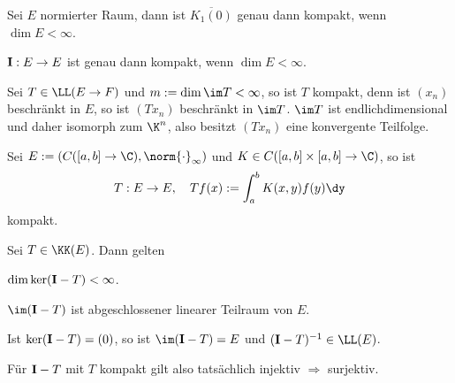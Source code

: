 \begin{cor}
\label{prop:6.10}
Sei $E$ normierter Raum, dann ist $\overline{K_1(0)}$ genau dann kompakt, wenn
$\dim E<\infty$.\fishhere
\end{cor}

\begin{bsp}
\label{bsp:6.11}
\begin{bspenum}
  \item $\mathbf{I}: E\to E$ ist genau dann kompakt, wenn $\dim E<\infty$.
  \item Sei $T\in\LL(E\to F)$ und $m:=\dim \im T < \infty$, so ist $T$ kompakt,
  denn ist $(x_n)$ beschränkt in $E$, so ist $(Tx_n)$ beschränkt in $\im T$.
  $\im T$ ist endlichdimensional und daher isomorph zum $\K^n$, also besitzt
  $(Tx_n)$ eine konvergente Teilfolge.
  \item Sei $E:=(C([a,b]\to\C),\norm{\cdot}_\infty)$ und $K\in
  C([a,b]\times[a,b]\to\C)$, so ist
\begin{align*}
T : E\to E,\quad Tf(x) := \int_a^b K(x,y)f(y)\dy
\end{align*}
kompakt.\bsphere
\end{bspenum}
\end{bsp}

\begin{prop}
\label{prop:6.12}
Sei $T\in\KK(E)$. Dann gelten
\begin{propenum}
  \item $\dim \ker (\mathbf{I} - T) < \infty$.
  \item $\im (\Id - T)$ ist abgeschlossener linearer Teilraum von $E$.
  \item Ist $\ker (\mathbf{I}-T) = (0)$, so ist $\im (\Id - T) = E$ und
  $(\Id-T)^{-1}\in\LL(E)$.\fishhere
\end{propenum}
\end{prop}

Für $\mathbf{I}-T$ mit $T$ kompakt gilt also tatsächlich injektiv $\Rightarrow$
surjektiv.

